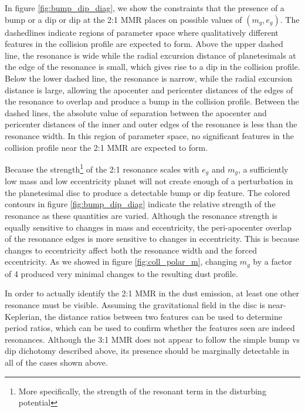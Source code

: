 In figure \ref{fig:bump_dip_diag}, we show the constraints that the presence of a bump or a dip or dip at the 2:1 MMR places on 
possible values of $(m_{g}, e_{g})$. The dashedlines indicate regions of parameter space where qualitatively different features in 
the collision profile are expected to form. Above the upper dashed line, the resonance is wide while the radial excursion distance 
of planetesimals at the edge of the resonance is small, which gives rise to a dip in the collision profile. Below the lower dashed 
line, the resonance is narrow, while the radial excursion distance is large, allowing the apocenter and pericenter distances of the 
edges of the resonance to overlap and produce a bump in the collision profile. Between the dashed lines, the absolute value of 
separation between the apocenter and pericenter distances of the inner and outer edges of the resonance is less than the 
resonance width. In this region of parameter space, no significant features in the collision profile near the 2:1 MMR are expected 
to form. 

Because the strength\footnote{More specifically, the strength of the resonant term in the disturbing potential} of the 2:1 
resonance scales with $e_{g}$ and  $m_{g}$, a sufficiently low mass and low eccentricity planet will not create enough of a 
perturbation in the planetesimal disc to produce a detectable bump or dip feature. The colored contours in figure 
\ref{fig:bump_dip_diag} indicate the relative strength of the resonance as these quantities are varied. Although the resonance 
strength is equally sensitive to changes in mass and eccentricity, the peri-apocenter overlap of the resonance edges is more 
sensitive to changes in eccentricity. This is because changes to eccentricity affect both the resonance width and the forced 
eccentricity. As we showed in figure \ref{fig:coll_polar_m}, changing $m_{g}$ by a factor of 4 produced very minimal changes to 
the resulting dust profile.

In order to actually identify the 2:1 MMR in the dust emission, at least one other resonance must be visible. Assuming the 
gravitational field in the disc is near-Keplerian, the distance ratios between two features can be used to determine period ratios, 
which can be used to confirm whether the features seen are indeed resonances. Although the 3:1 MMR does not appear to 
follow the simple bump vs dip dichotomy described above, its presence should be marginally detectable in all of the cases 
shown above.

